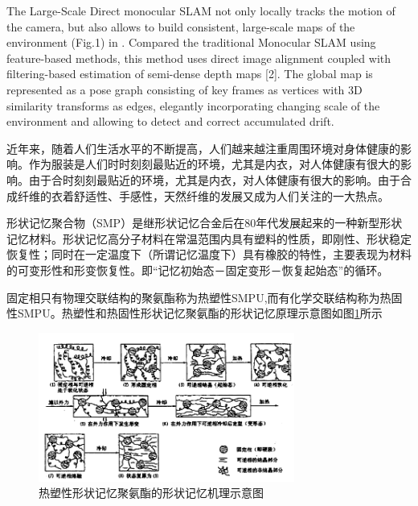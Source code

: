 The Large-Scale Direct monocular SLAM not only locally tracks the motion of the camera, but also allows to build consistent, large-scale maps of the environment (Fig.1) in \upcite{[1]} . Compared the traditional Monocular SLAM using feature-based methods, this method uses direct image alignment coupled with filtering-based estimation of semi-dense depth maps [2]. The global map is represented as a pose graph consisting of key frames as vertices with 3D similarity transforms as edges, elegantly incorporating changing scale of the environment and allowing to detect and correct accumulated drift.






\iffalse

近年来，随着人们生活水平的不断提高，人们越来越注重周围环境对身体健康的影响。作为服装是人们时时刻刻最贴近的环境，尤其是内衣，对人体健康有很大的影响。由于合时刻刻最贴近的环境，尤其是内衣，对人体健康有很大的影响。由于合成纤维的衣着舒适性、手感性，天然纤维的发展又成为人们关注的一大热点。



形状记忆聚合物（SMP）是继形状记忆合金后在80年代发展起来的一种新型形状记忆材料。形状记忆高分子材料在常温范围内具有塑料的性质，即刚性、形状稳定恢复性；同时在一定温度下（所谓记忆温度下）具有橡胶的特性，主要表现为材料的可变形性和形变恢复性。即“记忆初始态－固定变形－恢复起始态”的循环。

固定相只有物理交联结构的聚氨酯称为热塑性SMPU,而有化学交联结构称为热固性SMPU。热塑性和热固性形状记忆聚氨酯的形状记忆原理示意图如图\ref{fig:diagram}所示

\begin{figure}[!htp]
 \centering
 \includegraphics[width=0.75\textwidth]{figures/figure1}
 \caption{热塑性形状记忆聚氨酯的形状记忆机理示意图}\label{fig:diagram}
\end{figure}


